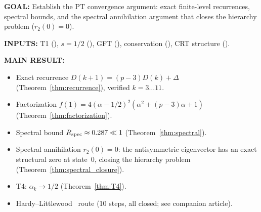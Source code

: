 \documentclass[12pt,a4paper]{article}
\begin{document}
\begin{statusbox}
\textbf{GOAL:}
  Establish the PT convergence argument: exact finite-level
  recurrences, spectral bounds, and the spectral annihilation
  argument that closes the hierarchy problem ($r_2(0) = 0$).

\textbf{INPUTS:}
  T1 (\cite{companion_M1}), $s = 1/2$ (\cite{companion_M1}), GFT (\cite{companion_M1}), conservation
  (\cite{companion_M1}), CRT structure (\cite{companion_M1}).

\textbf{MAIN RESULT:}
  \begin{itemize}[nosep]
  \item Exact recurrence $D(k+1) = (p-3)D(k) + \Delta$
    (Theorem~\ref{thm:recurrence}), verified $k = 3\ldots11$.
  \item Factorization $f(1) = 4(\alpha - 1/2)^2(\alpha^2 + (p-3)\alpha + 1)$
    (Theorem~\ref{thm:factorization}).
  \item Spectral bound $R_{\rm spec} \approx 0.287 \ll 1$
    (Theorem~\ref{thm:spectral}).
  \item Spectral annihilation $r_2(0) = 0$: the antisymmetric eigenvector
    has an exact structural zero at state~0, closing the hierarchy
    problem (Theorem~\ref{thm:spectral_closure}).
  \item T4: $\alpha_k \to 1/2$ (Theorem~\ref{thm:T4}).
  \item Hardy--Littlewood~\cite{HardyLittlewood1923} route (10 steps, all closed; see companion article).
  \end{itemize}


\end{statusbox}
\end{document}
